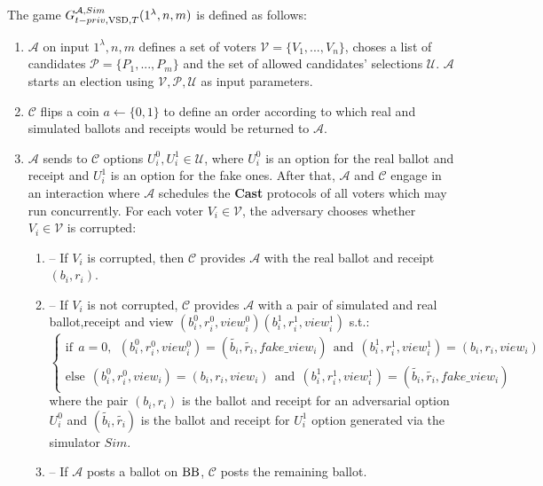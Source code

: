  
The game $G_{t-priv, \operatorname{VSD},T}^{\mathcal{A},Sim}(1^{\lambda},n,m)$ is defined as follows:
\begin{enumerate} 
\item $\mathcal{A}$ on input $1^{\lambda},n,m$ defines a set of voters  $\mathcal{V} = \{V_1,...,V_n\}$, choses a list of candidates  $\mathcal{P} = \{P_1,...,P_m\}$ and the set of allowed candidates' selections $\mathcal{U}$.  $\mathcal{A}$ starts an election using $\mathcal{V}, \mathcal{P}, \mathcal{U}$ as input parameters.
\item $\mathcal{C}$ flips a coin $a \leftarrow \{0,1\}$ to define an order according to which real and simulated ballots and receipts would be returned to $\mathcal{A}$.
\item   $\mathcal{A}$ sends to  $\mathcal{C}$ options $U_i^0, U_i^1 \in  \mathcal{U}$, where $U_i^0$ is an option for the real ballot and receipt and $U_i^1$ is an option for the fake ones.  After that, $\mathcal{A}$ and $\mathcal{C}$ engage in an interaction where $\mathcal{A}$ schedules the \textbf{Cast}   protocols of all voters which may run concurrently. For each voter $V_i \in \mathcal{V}$, the adversary chooses whether $V_i \in \mathcal{V}$ is corrupted: 
\begin{enumerate}
\item[] -- If $V_i$ is corrupted, then $\mathcal{C}$ provides $\mathcal{A}$ with the real ballot and receipt $(b_i,r_i)$.
\item[] --  If $V_i$ is not corrupted, $\mathcal{C}$  provides $\mathcal{A}$ with a pair of simulated and real ballot,receipt and view $(b_i^0, r_i^0,view_i^0) (b_i^1, r_i^1,view_i^1)$ s.t.:\\
$ \begin{cases}
 \text{if} ~~a =0,~~ (b_i^0,r_i^0,view_i^0) = (\tilde{b_i},\tilde{r_i},fake\_view_i) ~~ \text{and} ~~  (b_i^1,r_i^1,view_i^1) = (b_i,r_i,view_i)   \\ 
 \text{else}~~ (b_i^0,r_i^0,view_i) =(b_i,r_i,view_i)~~  \text{and} ~~  (b_i^1,r_i^1,view_i^1) =(\tilde{b_i},\tilde{r_i},fake\_view_i)
\end{cases}$\\ 
where the pair $(b_i, r_i)$ is the ballot and receipt for an adversarial option $U_i^0$ and $(\tilde{b_i},\tilde{r_i})$ is the ballot and receipt for  $U_i^1$ option generated via the simulator $Sim$.
\item[] --  If  $\mathcal{A}$ posts a ballot on $\operatorname{BB}$, $\mathcal{C}$ posts the remaining ballot. 
\end{enumerate}

\end{enumerate}
